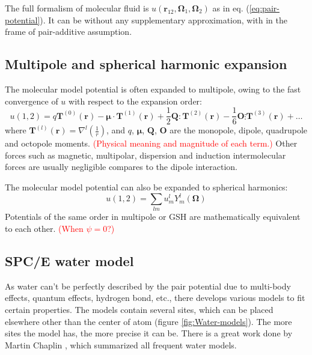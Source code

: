 The full formalism of molecular fluid is $u(\mathbf{r}_{12},\mathbf{\Omega}_{1},\mathbf{\Omega}_{2})$
as in eq. (\ref{eq:pair-potential}). It can be without any supplementary
approximation, with in the frame of pair-additive assumption. 


\subsection{Multipole and spherical harmonic expansion}

The molecular model potential is often expanded to multipole, owing
to the fast convergence of $u$ with respect to the expansion order:
\begin{equation}
u(1,2)=q\mathbf{T}^{(0)}(\mathbf{r})-\boldsymbol{\mu}\cdotp\mathbf{T}^{(1)}(\mathbf{r})+\dfrac{1}{2}\mathbf{Q}\colon\mathbf{T}^{(2)}(\mathbf{r})-\dfrac{1}{6}\mathbf{O}\vdots\mathbf{T}^{(3)}(\mathbf{r})+\ldots
\end{equation}
where $\mathbf{T}^{(l)}(\mathbf{r})=\nabla^{l}\left(\frac{1}{r}\right)$,
and $q$, $\boldsymbol{\mu}$, $\mathbf{Q}$, $\mathbf{O}$ are the
monopole, dipole, quadrupole and octopole moments. \textcolor{red}{(Physical
meaning and magnitude of each term.)} Other forces such as magnetic,
multipolar, dispersion and induction intermolecular forces are usually
negligible compares to the dipole interaction.

The molecular model potential can also be expanded to spherical harmonics:
\begin{equation}
u(1,2)=\sum_{lm}u_{m}^{l}Y_{m}^{l}(\mathbf{\Omega})
\end{equation}
 Potentials of the same order in multipole or \acs{GSH} are mathematically
equivalent to each other. \textcolor{red}{(When $\psi=0$?)}


\subsection{SPC/E water model}

As water can't be perfectly described by the pair potential due to
multi-body effects, quantum effects, hydrogen bond, etc., there develops
various models to fit certain properties. The models contain several
sites, which can be placed elsewhere other than the center of atom
(figure \ref{fig:Water-models}). The more sites the model has, the
more precise it can be. There is a great work done by Martin Chaplin
\citep{water-model}, which summarized all frequent water models. 


